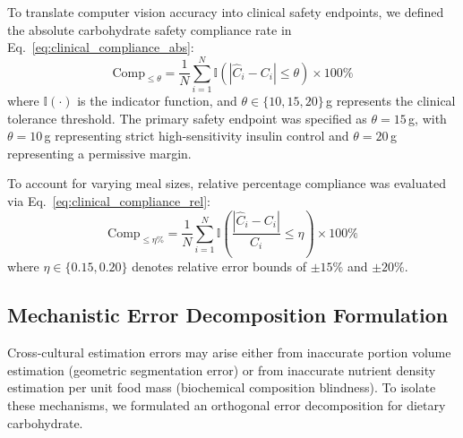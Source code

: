 \documentclass[utf8]{FrontiersinVancouver}
\begin{document}
To translate computer vision accuracy into clinical safety endpoints, we defined the absolute carbohydrate safety compliance rate in Eq.~\ref{eq:clinical_compliance_abs}:
\begin{equation}
    \label{eq:clinical_compliance_abs}
    \text{Comp}_{\le \theta} = \frac{1}{N} \sum_{i=1}^N \mathbb{I}\left( |\hat{C}_i - C_i| \le \theta \right) \times 100\%
\end{equation}
where $\mathbb{I}(\cdot)$ is the indicator function, and $\theta \in \{10, 15, 20\}$\,g represents the clinical tolerance threshold. The primary safety endpoint was specified as $\theta = 15$\,g, with $\theta = 10$\,g representing strict high-sensitivity insulin control and $\theta = 20$\,g representing a permissive margin.

To account for varying meal sizes, relative percentage compliance was evaluated via Eq.~\ref{eq:clinical_compliance_rel}:
\begin{equation}
    \label{eq:clinical_compliance_rel}
    \text{Comp}_{\le \eta\%} = \frac{1}{N} \sum_{i=1}^N \mathbb{I}\left( \frac{|\hat{C}_i - C_i|}{C_i} \le \eta \right) \times 100\%
\end{equation}
where $\eta \in \{0.15, 0.20\}$ denotes relative error bounds of $\pm 15\%$ and $\pm 20\%$.

\subsection{Mechanistic Error Decomposition Formulation}

Cross-cultural estimation errors may arise either from inaccurate portion volume estimation (geometric segmentation error) or from inaccurate nutrient density estimation per unit food mass (biochemical composition blindness). To isolate these mechanisms, we formulated an orthogonal error decomposition for dietary carbohydrate.
\end{document}

